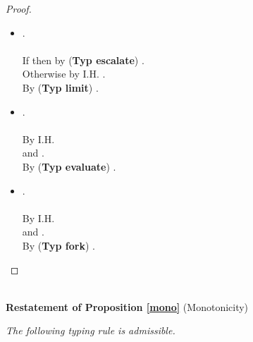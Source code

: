 \documentclass{sigplanconf}
\newcommand{\trule}[1]{(\textbf{Typ #1})}
\begin{document}
\begin{proof}
\begin{itemize}
\item .\\
\\
If  then by \trule{escalate} .\\
Otherwise by I.H. .\\
 By \trule{limit} .\\
\item .\\
\\
By I.H. \\
 and  .\\
By \trule{evaluate} .\\
\item .\\
\\
By I.H. \\
 and  .\\
By \trule{fork} .  \qedhere
\end{itemize}
\end{proof}
\\
{\bf Restatement of Proposition \ref{mono}} (Monotonicity) {\em
The following typing rule is admissible.

}
\end{document}
